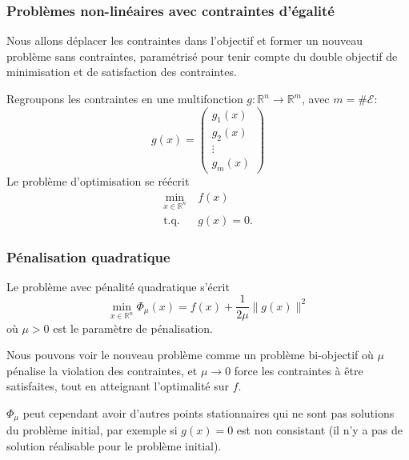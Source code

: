 \documentclass[t,usepdftitle=false,aspectratio=169]{beamer}
\def\cE{\mathcal{E}}
\def\RR{\mathbb{R}}
\begin{document}
\begin{frame}
\frametitle{Problèmes non-linéaires avec contraintes d'égalité}

Nous allons déplacer les contraintes dans l'objectif et former un nouveau problème sans contraintes, paramétrisé pour tenir compte du double objectif de minimisation et de satisfaction des contraintes.

\mbox{}

Regroupons les contraintes en une multifonction $g: \RR^n \rightarrow \RR^m$, avec $m = \#\cE$:
$$
g(x) = \begin{pmatrix} g_1(x) \\ g_2(x) \\ \vdots \\ g_m(x) \end{pmatrix}
$$
Le problème d'optimisation se réécrit
\begin{align*}
\min_{x \in \RR^n}\ & f(x) \\
\mbox{t.q. } &g(x) = 0.
\end{align*}

\end{frame}

\begin{frame}
\frametitle{Pénalisation quadratique}

Le problème avec pénalité quadratique s'écrit
$$
\min_{x \in \RR^n} \Phi_{\mu}(x) = f(x) + \frac{1}{2\mu} \| g(x) \|^2
$$
où $\mu > 0$ est le paramètre de pénalisation.

\mbox{}

Nous pouvons voir le nouveau problème comme un problème bi-objectif où $\mu$ pénalise la violation des contraintes, et $\mu \rightarrow 0$ force les contraintes à être satisfaites, tout en atteignant l'optimalité sur $f$.

\mbox{}

$\Phi_{\mu}$ peut cependant avoir d'autres points stationnaires qui ne sont pas solutions du problème initial, par exemple si $g(x) = 0$ est non consistant (il n'y a pas de solution réalisable pour le problème initial).

\end{frame}
\end{document}
